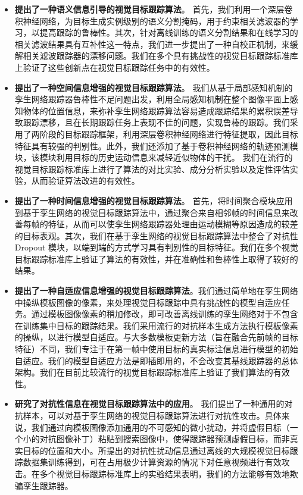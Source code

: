\begin{itemize}
\item \textbf{提出了一种语义信息引导的视觉目标跟踪算法}。
首先，我们利用一个深层卷积神经网络，为目标生成实例级别的语义分割掩码，用于约束相关滤波器的学习，以提高跟踪的鲁棒性。其次，针对离线训练的语义分割结果和在线学习的相关滤波结果具有互补性这一特点，我们进一步提出了一种自校正机制，来缓解相关滤波跟踪器的漂移问题。我们在多个具有挑战性的视觉目标跟踪标准库上验证了这些创新点在视觉目标跟踪任务中的有效性。
\item \textbf{提出了一种空间信息增强的视觉目标跟踪算法}。
我们从基于局部感知机制的孪生网络跟踪器鲁棒性不足问题出发，利用全局感知机制在整个图像平面上感知物体的位置信息，来弥补孪生网络跟踪算法容易造成跟踪结果的累积误差导致跟踪漂移，且在长期跟踪任务上表现不佳的问题，实现鲁棒的跟踪。我们采用了两阶段的目标跟踪框架，利用深层卷积神经网络进行特征提取，因此目标特征具有较强的判别性。此外，我们还添加了基于卷积神经网络的轨迹预测模块，该模块利用目标的历史运动信息来减轻近似物体的干扰。
我们在流行的视觉目标跟踪标准库上进行了算法的对比实验、成分分析实验以及定性评估实验，从而验证算法改进的有效性。
\item \textbf{提出了一种时间信息增强的视觉目标跟踪算法}。
首先，将时间聚合模块应用到基于孪生网络的视觉目标跟踪算法中，通过聚合来自相邻帧的时间信息来改善每帧的特征，从而可以使孪生网络跟踪器处理由运动模糊等原因造成的较差的目标表观。其次，我们在基于孪生网络的视觉目标跟踪算法中整合了对抗性 Dropout 模块，以端到端的方式学习具有判别性的目标特征。我们在多个视觉目标跟踪标准库上验证了算法的有效性，并在准确性和鲁棒性上取得了较好的结果。
\item \textbf{提出了一种自适应信息增强的视觉目标跟踪算法}。我们通过简单地在孪生网络中操纵模板图像的像素，来处理视觉目标跟踪中具有挑战性的模型自适应任务。通过模板图像像素的稍加修改，即可改善离线训练的孪生网络对于不包含在训练集中目标的跟踪结果。我们采用流行的对抗样本生成方法执行模板像素的操纵，以进行模型自适应。与大多数模板更新方法（旨在融合先前帧的目标特征）不同，我们专注于在第一帧中使用目标的真实标注信息进行模型的初始自适应。我们的模型自适应方法是即插即用的，不会改变其基线跟踪器的总体架构。我们在目前比较流行的视觉目标跟踪标准库上验证了我们算法的有效性。
\item \textbf{研究了对抗性信息在视觉目标跟踪算法中的应用}。
我们提出了一种通用的对抗样本，可以对基于孪生网络的视觉目标跟踪算法进行对抗性攻击。具体来说，我们通过向模板图像添加通用的不可感知的微小扰动，并将虚假目标（一个小的对抗图像补丁）粘贴到搜索图像中，使得跟踪器预测虚假目标，而非真实目标的位置和大小。所提出的对抗性扰动信息通过离线的大规模视觉目标跟踪数据集训练得到，可在占用极少计算资源的情况下对任意视频进行有效攻击。在多个视觉目标跟踪标准库上的实验结果表明，我们的方法能够有效地欺骗孪生跟踪器。
\end{itemize}


